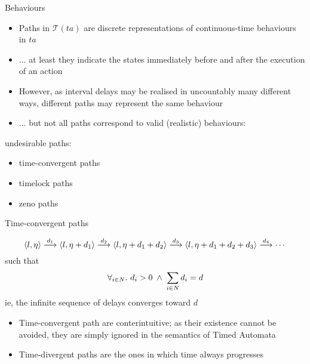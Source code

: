 \documentclass{beamer}
\def\dgold#1{{\darkgoldenrod #1}}
\def\dkb#1{{\blue #1}}
\def\st{\mathbf{.}\,}
\def\TL#1{\mathcal{T}(#1)}
\begin{document}
\begin{slide}{Behaviours}
\small

\begin{itemize}
\item Paths in $\TL{ta}$ are \dkb{discrete representations of continuous-time behaviours} in $ta$
\item ... at least they indicate the states immediately before and after the execution of an action
\item However, as interval delays may be realised in \dgold{uncountably} many different ways, different paths 
may represent the same behaviour
\pause
\item ... but not all paths correspond to valid  (\dkb{realistic}) behaviours:
\end{itemize}

\begin{block}{undesirable paths:}
\begin{itemize}
\item  \dkb{time-convergent} paths
\item  \dkb{timelock} paths
\item  \dkb{zeno} paths
\end{itemize}
\end{block}
\end{slide}

\begin{slide}{Time-convergent paths}
\small

\begin{equation*}
\mathopen{\langle}l,\eta\mathclose{\rangle}  \stackrel{d_1}{\longrightarrow} \mathopen{\langle}l,\eta + d_1\mathclose{\rangle}  \stackrel{d_2}{\longrightarrow} \mathopen{\langle}l,\eta + d_1 + d_2\mathclose{\rangle}  \stackrel{d_3}{\longrightarrow} \mathopen{\langle}l,\eta + d_1 + d_2 + d_3\mathclose{\rangle}  \stackrel{d_4}{\longrightarrow} 
\cdots  
\end{equation*}
such that 
\begin{equation*}
\forall_{i \in N}\st\, d_i > 0\; \e\; \sum_{i \in N}  d_i = d
\end{equation*}
ie, the \dgold{infinite sequence of delays converges toward $d$}

\begin{itemize}
\item Time-convergent path are \dgold{conterintuitive}; as their existence cannot be avoided, they are simply  \dkb{ignored} in the semantics of Timed Automata
\item Time-\dkb{divergent} paths are the ones in which time always progresses
\end{itemize}
\end{slide}
\end{document}
